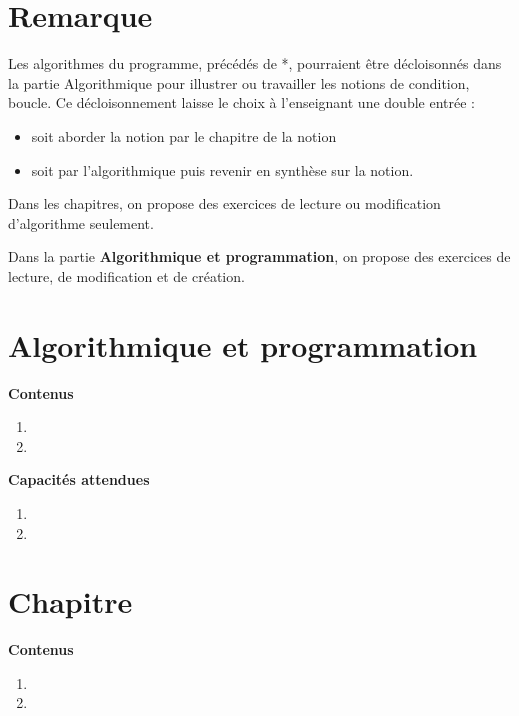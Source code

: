 \documentclass[10pt,a4paper]{article}
\begin{document}
 


\section*{Remarque}

Les algorithmes du programme, précédés de *, pourraient être décloisonnés dans la partie Algorithmique pour illustrer ou travailler les notions de condition, boucle.
Ce décloisonnement laisse le choix à l'enseignant une double entrée : 
\begin{itemize}
\item soit aborder la notion par le chapitre de la notion
\item soit par l'algorithmique puis revenir en synthèse sur la notion.
\end{itemize}

Dans les chapitres, on propose des exercices de lecture ou modification d'algorithme seulement. 

Dans la partie \textbf{Algorithmique et programmation}, on propose des exercices de  lecture, de  modification et de création.


\section{Algorithmique et programmation}

\textbf{Contenus}

\begin{enumerate} 
\item 
\item 
\end{enumerate}


\textbf{Capacités attendues}

\begin{enumerate}
\item 
\item 
\end{enumerate}


\section{Chapitre}

\textbf{Contenus}

\begin{enumerate} 
\item 
\item 
\end{enumerate}
\end{document}
